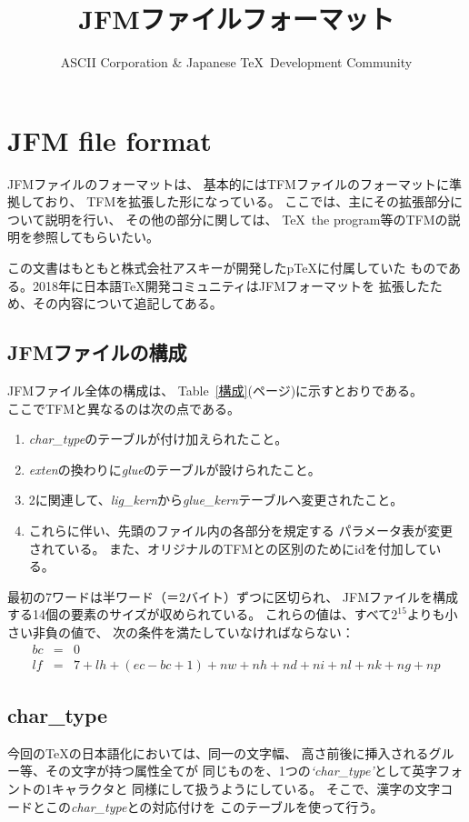 \documentclass[a4paper,11pt,nomag]{jsarticle}
\title{JFMファイルフォーマット}
\author{ASCII Corporation \& Japanese \TeX\ Development Community}
\begin{document}
\maketitle

\section{JFM file format}
JFMファイルのフォーマットは、
基本的にはTFMファイルのフォーマットに準拠しており、
TFMを拡張した形になっている。
ここでは、主にその拡張部分について説明を行い、
その他の部分に関しては、
\TeX\ the program等のTFMの説明を参照してもらいたい。

この文書はもともと株式会社アスキーが開発したp\TeX{}に付属していた
ものである。2018年に日本語\TeX{}開発コミュニティはJFMフォーマットを
拡張したため、その内容について追記してある。

\subsection{JFMファイルの構成}
JFMファイル全体の構成は、
Table~\ref{構成}(\pageref{構成}ページ)に示すとおりである。 \\
ここでTFMと異なるのは次の点である。
\begin{enumerate}
\item {\it char\_type}のテーブルが付け加えられたこと。
\item {\it exten}の換わりに{\it glue}のテーブルが設けられたこと。
\item 2に関連して、{\it lig\_kern}から{\it glue\_kern}テーブルへ変更されたこと。
\item これらに伴い、先頭のファイル内の各部分を規定する
	パラメータ表が変更されている。
	また、オリジナルのTFMとの区別のためにidを付加している。
\end{enumerate}
最初の7ワードは半ワード（＝2バイト）ずつに区切られ、
JFMファイルを構成する14個の要素のサイズが収められている。
これらの値は、すべて$2^{15}$よりも小さい非負の値で、
次の条件を満たしていなければならない：
\begin{eqnarray*}
bc &=& 0 \\
lf &=& 7 + lh + (ec - bc + 1) + nw + nh + nd + ni + nl + nk + ng + np
\end{eqnarray*}

\subsection{char\_type}
今回の\TeX の日本語化においては、同一の文字幅、
高さ前後に挿入されるグルー等、その文字が持つ属性全てが
同じものを、1つの{\it `char\_type'}として英字フォントの1キャラクタと
同様にして扱うようにしている。
そこで、漢字の文字コードとこの{\it char\_type}との対応付けを
このテーブルを使って行う。
\end{document}
